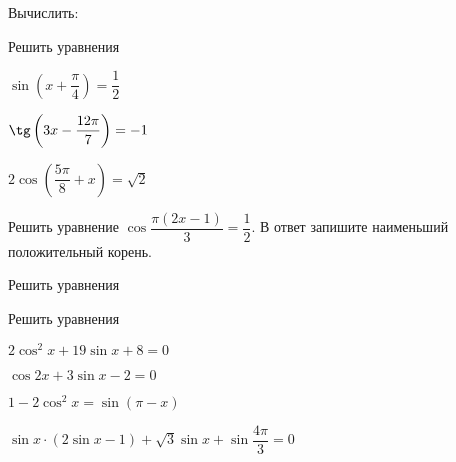 \begin{listofex}
	\item Вычислить:
	\begin{enumcols}[itemcolumns=2]
		\item {}
		\item {}
		\item {}
		\item {}
	\end{enumcols}
	\item Решить уравнения
	\begin{enumcols}[itemcolumns=3]
		\item \( \sin \left( x+\dfrac{\pi}{4} \right) = \dfrac{1}{2} \)
		\item \( \tg \left( 3x-\dfrac{12\pi}{7} \right) = -1 \)
		\item \( 2\cos \left( \dfrac{5\pi}{8}+x \right) = \sqrt{2} \)
	\end{enumcols}
	\item Решить уравнение \( \cos\dfrac{\pi(2x-1)}{3}=\dfrac{1}{2} \). В ответ запишите наименьший положительный корень.
	\item Решить уравнения
	\begin{enumcols}[itemcolumns=2]
		\item {}
		\item {}
		\item {}
		\item {}
		\item {}
		\item {}
	\end{enumcols}
	\item Решить уравнения
	\begin{enumcols}[itemcolumns=2]
		\item \( 2\cos^2x+19\sin x+8=0\) 
		\item \( \cos2x +3\sin x-2 =0 \) 
		\item \( 1-2\cos^2 x=\sin(\pi-x) \) 
		\item \( \sin x\cdot(2\sin x - 1)+\sqrt{3}\sin x + \sin \dfrac{4\pi}{3}=0 \) 
	\end{enumcols}
	
\end{listofex}
